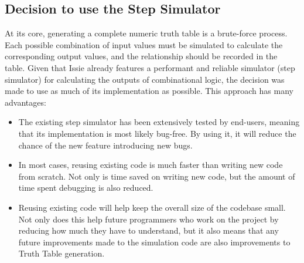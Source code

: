 \subsection{Decision to use the Step Simulator}
At its core, generating a complete numeric truth table is a brute-force process. Each possible combination of input values must be simulated to calculate the corresponding output values, and the relationship should be recorded in the table. 
Given that Issie already features a performant and reliable simulator (step simulator) for calculating the outputs of combinational logic, the decision was made to use as much of its implementation as possible. This approach has many advantages:
\begin{itemize}
    \item The existing step simulator has been extensively tested by end-users, meaning that its implementation is most likely bug-free. By using it, it will reduce the chance of the new feature introducing new bugs.
    \item In most cases, reusing existing code is much faster than writing new code from scratch. Not only is time saved on writing new code, but the amount of time spent debugging is also reduced.
    \item Reusing existing code will help keep the overall size of the codebase small. Not only does this help future programmers who work on the project by reducing how much they have to understand, but it also means that any future improvements made to the simulation code are also improvements to Truth Table generation.
\end{itemize}

